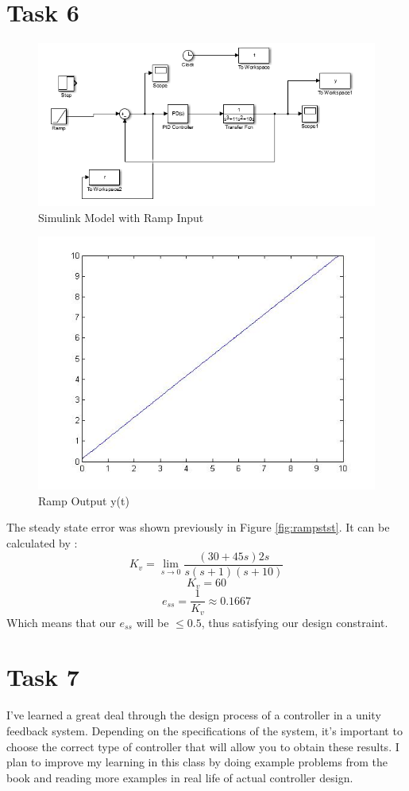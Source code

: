 \documentclass[12pt,letter]{article}
\begin{document}
\section*{Task 6}
\begin{figure}[H]
\centering
\includegraphics[width=1\linewidth]{rampinput}
\caption{Simulink Model with Ramp Input}
\label{fig:rampinput}
\end{figure}

\begin{figure}[H]
\centering
\includegraphics[width=1\linewidth]{rampoutput}
\caption{Ramp Output y(t)}
\label{fig:rampoutput}

\end{figure}
The steady state error was shown previously in Figure \ref{fig:rampstst}. It can be calculated by : 
$$K_v = \lim_{s \to 0} \frac{(30+45s)2s}{s(s+1)(s+10)}$$
$$K_v = 60$$
$$e_{ss} = \frac{1}{K_v} \approx 0.1667$$
Which means that our $e_{ss}$ will be $\le 0.5$, thus satisfying our design constraint.

\section*{Task 7}
I've learned a great deal through the design process of a controller in a unity feedback system. Depending on the specifications of the system, it's important to choose the correct type of controller that will allow you to obtain these results. I plan to improve my learning in this class by doing example problems from the book and reading more examples in real life of actual controller design. 
\end{document}

